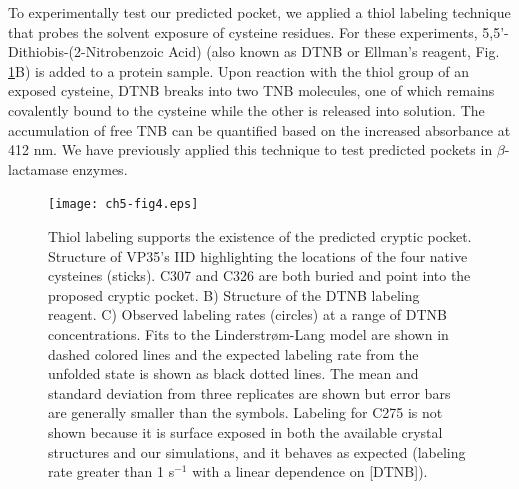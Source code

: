 \documentclass[../main.tex]{subfiles}
\begin{document}
        To experimentally test our predicted pocket, we applied a thiol labeling technique that probes the solvent exposure of cysteine residues\cite{bernstein_structural_2011}. For these experiments, 5,5’-Dithiobis-(2-Nitrobenzoic Acid) (also known as DTNB or Ellman’s reagent, Fig. \ref{fig:ch5-fig4}B) is added to a protein sample. Upon reaction with the thiol group of an exposed cysteine, DTNB breaks into two TNB molecules, one of which remains covalently bound to the cysteine while the other is released into solution. The accumulation of free TNB can be quantified based on the increased absorbance at 412 nm. We have previously applied this technique to test predicted pockets in $\beta$-lactamase enzymes\cite{Porter:2019hv,Bowman:2015dh}.

        \begin{figure}[!htb] %
            \centering
            \texttt{[image: ch5-fig4.eps]}
            \caption[Thiol labeling supports the existence of the predicted cryptic pocket.]
                {Thiol labeling supports the existence of the predicted cryptic pocket. Structure of VP35’s IID highlighting the locations of the four native cysteines (sticks). C307 and C326 are both buried and point into the proposed cryptic pocket. B) Structure of the DTNB labeling reagent. C) Observed labeling rates (circles) at a range of DTNB concentrations. Fits to the Linderstrøm-Lang model are shown in dashed colored lines and the expected labeling rate from the unfolded state is shown as black dotted lines. The mean and standard deviation from three replicates are shown but error bars are generally smaller than the symbols. Labeling for C275 is not shown because it is surface exposed in both the available crystal structures and our simulations, and it behaves as expected (labeling rate greater than 1 s$^{-1}$ with a linear dependence on [DTNB]).}
            \label{fig:ch5-fig4}
        \end{figure}
\end{document}
